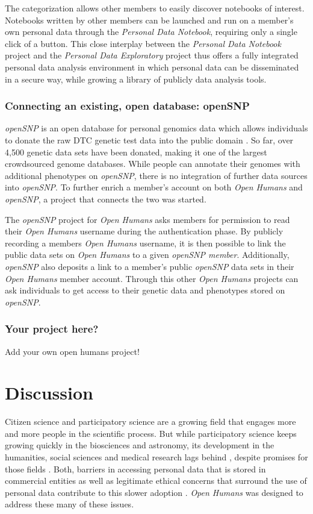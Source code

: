\documentclass[a4paper,num-refs]{oup-contemporary}
\begin{document}
The categorization allows other members to easily discover notebooks of interest. Notebooks written by other members can be launched and run on a member's own personal data through the \textit{Personal Data Notebook}, requiring only a single click of a button. This close interplay between the \textit{Personal Data Notebook} project and the \textit{Personal Data Exploratory} project thus offers a fully integrated personal data analysis environment in which personal data can be disseminated in a secure way, while growing a library of publicly data analysis tools.

\subsubsection{Connecting an existing, open database: openSNP}
\textit{openSNP} is an open database for personal genomics data which allows individuals to donate the raw DTC genetic test data into the public domain \cite{Greshake2014}. So far, over 4,500 genetic data sets have been donated, making it one of the largest crowdsourced genome databases. While people can annotate their genomes with additional phenotypes on \textit{openSNP}, there is no integration of further data sources into \textit{openSNP}. To further enrich a member's account on both \textit{Open Humans} and \textit{openSNP}, a project that connects the two was started.

The \textit{openSNP} project for \textit{Open Humans} asks members for permission to read their \textit{Open Humans} username during the authentication phase. By publicly recording a members \textit{Open Humans} username, it is then possible to link the public data sets on \textit{Open Humans} to a given \textit{openSNP member}. Additionally, \textit{openSNP} also deposits a link to a member's public \textit{openSNP} data sets in their \textit{Open Humans} member account. Through this other \textit{Open Humans} projects can ask individuals to get access to their genetic data and phenotypes stored on \textit{openSNP}.


\subsubsection{Your project here?}
Add your own open humans project!

\section{Discussion}
Citizen science and participatory science are a growing field that engages more and more people in the scientific process. But while participatory science keeps growing quickly in the biosciences and astronomy, its development in the humanities, social sciences and medical research lags behind \cite{Kullenberg2016}, despite promises for those fields \cite{Rowbotham2017,communityresearch}. Both, barriers in accessing personal data that is stored in commercial entities as well as legitimate ethical concerns that surround the use of personal data contribute to this slower adoption \cite{Ross2018, Wang2016}.
\textit{Open Humans} was designed to address these many of these issues. 
\end{document}
